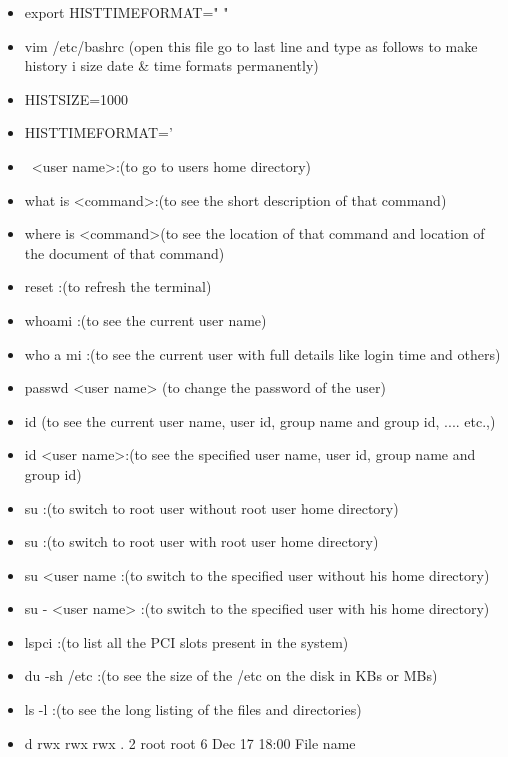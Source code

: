 \begin{enumerate}
\begin{itemize}
        \item export    HISTTIMEFORMAT="  "%
        \item vim  /etc/bashrc (open this file go to last line and type as follows to make history i size date & time 	 formats permanently)
        \item HISTSIZE=1000
        \item HISTTIMEFORMAT='    %
        \item ~<user name>:(to go to users home directory)
        \item what is    <command>:(to see the short description of that command)
        \item where is	<command>(to see the location of that command and location of the document of that command)
        \item reset :(to refresh the terminal)
        \item whoami :(to see the current user name)
        \item who  a  mi :(to see the current user with full details like login time and others)
        \item passwd     <user name>	(to change the password of the user)
        \item id (to see the current user name, user id, group name and group id, .... etc.,)
        \item id   <user name>:(to see the specified user name, user id, group name and group id)
        \item su :(to switch to root user without root user home directory)
        \item su :(to switch to root user with root user home directory)
        \item su    <user name	:(to switch to the specified user without his home directory)
        \item su    -    <user name> :(to switch to the specified user with his home directory)
        \item lspci	:(to list all the PCI slots present in the system)
        \item du   -sh   /etc :(to see the size of the   /etc   on the disk in KBs or MBs)
        \item ls    -l  :(to see the long listing of the files and directories)
        \item d  rwx  rwx  rwx   .   2    root    root     6      Dec 17   18:00     File name

\end{itemize}
\end{enumerate}
